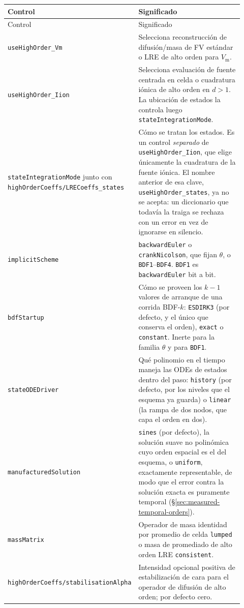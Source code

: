 \documentclass[11pt,a4paper]{article}
\newcommand{\code}[1]{\texttt{\small #1}}
\newcommand{\Vm}{V_{\text{m}}}
\begin{document}
\begin{longtable}{@{}p{0.34\linewidth}p{0.58\linewidth}@{}}
\toprule
Control & Significado \\
\midrule
\endfirsthead
\toprule
Control & Significado \\
\midrule
\endhead
\code{useHighOrder\_Vm} & Selecciona reconstrucción de difusión/masa de FV estándar o LRE de alto orden para $\Vm$. \\
\code{useHighOrder\_Iion} & Selecciona evaluación de fuente centrada en celda o cuadratura iónica de alto orden en $d>1$. La ubicación de estados la controla luego \code{stateIntegrationMode}. \\
\code{stateIntegrationMode} junto con \code{highOrderCoeffs/LRECoeffs\_states} & Cómo se tratan los estados. Es un control \emph{separado} de \code{useHighOrder\_Iion}, que elige únicamente la cuadratura de la fuente iónica. El nombre anterior de esa clave, \code{useHighOrder\_states}, ya no se acepta: un diccionario que todavía la traiga se rechaza con un error en vez de ignorarse en silencio. \\
\code{implicitScheme} & \code{backwardEuler} o \code{crankNicolson}, que fijan $\theta$, o \code{BDF1}--\code{BDF4}. \code{BDF1} es \code{backwardEuler} bit a bit. \\
\code{bdfStartup} & Cómo se proveen los $k-1$ valores de arranque de una corrida BDF-$k$: \code{ESDIRK3} (por defecto, y el único que conserva el orden), \code{exact} o \code{constant}. Inerte para la familia $\theta$ y para \code{BDF1}. \\
\code{stateODEDriver} & Qué polinomio en el tiempo maneja las ODEs de estados dentro del paso: \code{history} (por defecto, por los niveles que el esquema ya guarda) o \code{linear} (la rampa de dos nodos, que capa el orden en dos). \\
\code{manufacturedSolution} & \code{sines} (por defecto), la solución suave no polinómica cuyo orden espacial es el del esquema, o \code{uniform}, exactamente representable, de modo que el error contra la solución exacta es puramente temporal (\S\ref{sec:measured-temporal-orders}). \\
\code{massMatrix} & Operador de masa identidad por promedio de celda \code{lumped} o masa de promediado de alto orden LRE \code{consistent}. \\
\code{highOrderCoeffs/stabilisationAlpha} & Intensidad opcional positiva de estabilización de cara para el operador de difusión de alto orden; por defecto cero. \\

\end{longtable}
\end{document}
